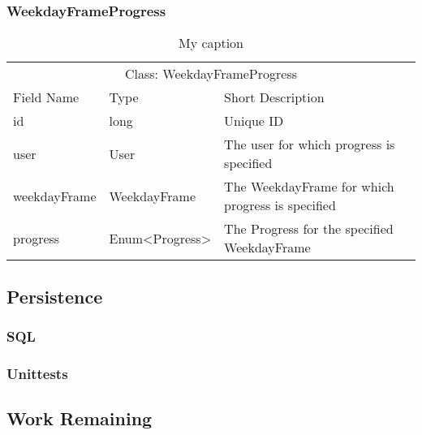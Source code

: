 \subsubsection{WeekdayFrameProgress}


\begin{table}[]
\centering
\caption{My caption}
\label{my-label}
\begin{tabular}{lll}
\multicolumn{3}{c}{Class: WeekdayFrameProgress}                                                     \\
Field Name   & Type                              & Short Description                                \\
id           & long                              & Unique ID                                        \\
user         & User                              & The user for which progress is specified         \\
weekdayFrame & WeekdayFrame                      & The WeekdayFrame for which progress is specified \\
progress     & Enum\textless Progress\textgreater & The Progress for the specified WeekdayFrame     
\end{tabular}
\end{table}





\subsection{Persistence}
\subsubsection{SQL}
\subsubsection{Unittests}



\subsection{Work Remaining} %


